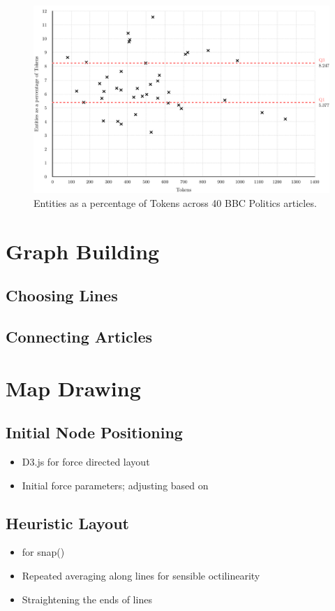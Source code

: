 \begin{figure}[htbp!]
	\centering
	\includegraphics[width=\textwidth]{img/implementation/TokensEntities.pdf}
	\caption{Entities as a percentage of Tokens across 40 BBC Politics articles.}
	\label{fig:tokensentities}
\end{figure}



\section{Graph Building}

\subsection{Choosing Lines}

\subsection{Connecting Articles}

\section{Map Drawing}

\subsection{Initial Node Positioning}
\begin{itemize}[noitemsep]
	\item D3.js for force directed layout
	\item Initial force parameters; adjusting based on \cite{AutomaticMetroMapLayoutThesis, AutomaticMetroMapLayout}
\end{itemize}

\subsection{Heuristic Layout}
\begin{itemize}[noitemsep]
	\item \cite{AutomaticMetroMapLayoutThesis, AutomaticMetroMapLayout} for snap()
	\item Repeated averaging along lines for sensible octilinearity
	\item Straightening the ends of lines
\end{itemize}
